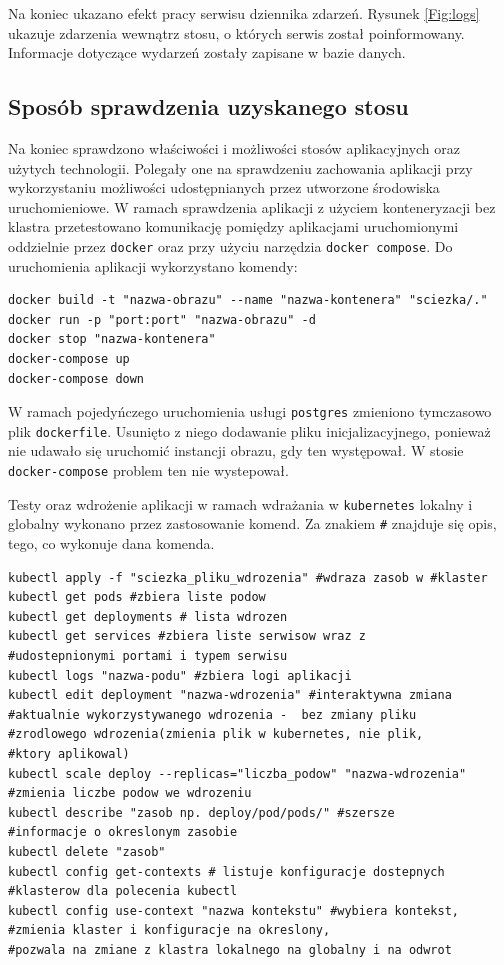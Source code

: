\documentclass[12pt,twoside]{article}
\begin{document}
Na koniec ukazano efekt pracy serwisu dziennika zdarzeń. Rysunek \ref{Fig:logs} ukazuje zdarzenia wewnątrz stosu, o których serwis został poinformowany. Informacje dotyczące wydarzeń zostały zapisane w bazie danych.
\subsection{Sposób sprawdzenia uzyskanego stosu}

Na koniec sprawdzono właściwości i możliwości stosów aplikacyjnych oraz użytych technologii. Polegały one na sprawdzeniu zachowania aplikacji przy wykorzystaniu możliwości udostępnianych przez utworzone środowiska uruchomieniowe. W ramach sprawdzenia aplikacji z użyciem konteneryzacji bez klastra przetestowano komunikację pomiędzy aplikacjami uruchomionymi oddzielnie przez \texttt{docker} oraz przy użyciu narzędzia \texttt{docker compose}. Do uruchomienia aplikacji wykorzystano komendy:
\begin{lstlisting}
docker build -t "nazwa-obrazu" --name "nazwa-kontenera" "sciezka/."
docker run -p "port:port" "nazwa-obrazu" -d
docker stop "nazwa-kontenera"
docker-compose up
docker-compose down
\end{lstlisting}
W ramach pojedyńczego uruchomienia usługi \texttt{postgres} zmieniono tymczasowo plik \texttt{dockerfile}. Usunięto z niego dodawanie pliku inicjalizacyjnego, ponieważ nie udawało się uruchomić instancji obrazu, gdy ten występował. W stosie \texttt{docker-compose} problem ten nie wystepował.

Testy oraz wdrożenie aplikacji w ramach wdrażania w \texttt{kubernetes} lokalny i globalny wykonano przez zastosowanie komend. Za znakiem  \verb|#| znajduje się opis, tego, co wykonuje dana komenda.
\begin{lstlisting}[breaklines]
kubectl apply -f "sciezka_pliku_wdrozenia" #wdraza zasob w #klaster
kubectl get pods #zbiera liste podow
kubectl get deployments # lista wdrozen
kubectl get services #zbiera liste serwisow wraz z 
#udostepnionymi portami i typem serwisu
kubectl logs "nazwa-podu" #zbiera logi aplikacji
kubectl edit deployment "nazwa-wdrozenia" #interaktywna zmiana 
#aktualnie wykorzystywanego wdrozenia -  bez zmiany pliku 
#zrodlowego wdrozenia(zmienia plik w kubernetes, nie plik, 
#ktory aplikowal)
kubectl scale deploy --replicas="liczba_podow" "nazwa-wdrozenia" #zmienia liczbe podow we wdrozeniu
kubectl describe "zasob np. deploy/pod/pods/" #szersze 
#informacje o okreslonym zasobie
kubectl delete "zasob"
kubectl config get-contexts # listuje konfiguracje dostepnych 
#klasterow dla polecenia kubectl
kubectl config use-context "nazwa kontekstu" #wybiera kontekst, 
#zmienia klaster i konfiguracje na okreslony, 
#pozwala na zmiane z klastra lokalnego na globalny i na odwrot
\end{lstlisting}
\end{document}
